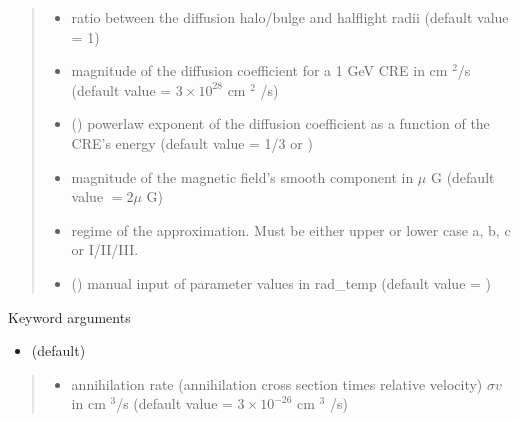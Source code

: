 \documentclass[letterpaper,10pt,english]{sphinxmanual}
\begin{document}
\begin{fulllineitems}
\begin{quote}
\begin{description}
\begin{itemize}
\item {} 
\sphinxAtStartPar
{} \textendash{} ratio between the diffusion halo/bulge and half\sphinxhyphen{}light radii (default value = 1)

\item {} 
\sphinxAtStartPar
{} \textendash{} magnitude of the diffusion coefficient for a 1 GeV CRE in cm \({}^2\)/s (default value = \(3\times 10^{28}\) cm \({}^2\) /s)

\item {} 
\sphinxAtStartPar
{} (\sphinxstyleliteralemphasis{\sphinxupquote{, }}) \textendash{} power\sphinxhyphen{}law exponent of the diffusion coefficient as a function of the CRE’s energy (default value = 1/3 or )

\item {} 
\sphinxAtStartPar
{} \textendash{} magnitude of the magnetic field’s smooth component in \(\mu\) G (default value \(= 2 \mu\) G)

\item {} 
\sphinxAtStartPar
{} \textendash{} regime of the approximation. Must be either upper or lower case a, b, c or I/II/III.

\item {} 
\sphinxAtStartPar
{} () \textendash{} manual input of parameter values in rad\_temp (default value = )

\end{itemize}

\end{description}\end{quote}

\sphinxAtStartPar
Keyword arguments
\begin{itemize}
\item {} 
\sphinxAtStartPar
{}    (default)

\end{itemize}
\begin{quote}\begin{description}
\begin{itemize}
\item {} 
\sphinxAtStartPar
{} \textendash{} annihilation rate (annihilation cross section times relative velocity) \(\sigma v\) in cm \({}^3\)/s (default value = \(3 \times 10^{-26}\) cm \({}^3\) /s)


\end{itemize}
\end{description}
\end{quote}
\end{fulllineitems}
\end{document}

